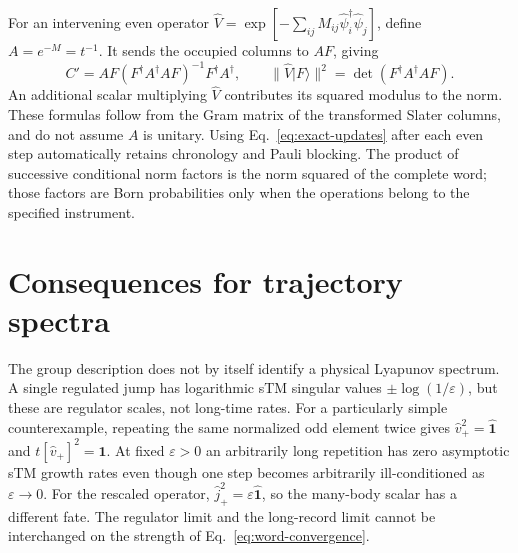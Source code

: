 \documentclass[aps,prb,onecolumn,nofootinbib,superscriptaddress]{revtex4-2}
\newcommand{\One}{\hat{\mathbf{1}}}
\newcommand{\Id}{\mathbf{1}}
\newcommand{\ket}[1]{\lvert #1\rangle}
\newcommand{\eps}{\varepsilon}
\begin{document}
For an intervening even operator
$\hat V=\exp[-\sum_{ij}M_{ij}\hat\psi_i^\dagger\hat\psi_j]$, define
$A=e^{-M}=t^{-1}$. It sends the occupied columns to $AF$, giving
\begin{equation}
 C'=AF(F^\dagger A^\dagger AF)^{-1}F^\dagger A^\dagger,
 \qquad
 \|\hat V\ket F\|^2=\det(F^\dagger A^\dagger AF).
 \label{eq:even-update}
\end{equation}
An additional scalar multiplying $\hat V$ contributes its squared modulus
to the norm. These formulas follow from the Gram matrix of the transformed
Slater columns, and do not assume $A$ is unitary. Using
Eq.~\eqref{eq:exact-updates} after each even step automatically retains
chronology and Pauli blocking. The product of successive conditional norm
factors is the norm squared of the complete word; those factors are Born
probabilities only when the operations belong to the specified instrument.

\section{Consequences for trajectory spectra}
The group description does not by itself identify a physical Lyapunov
spectrum. A single regulated jump has logarithmic sTM singular values
$\pm\log(1/\eps)$, but these are regulator scales, not long-time rates.
For a particularly simple counterexample, repeating the same normalized
odd element twice gives $\hat v_+^2=\One$ and $t[\hat v_+]^2=\Id$.
At fixed $\eps>0$ an arbitrarily long repetition has zero asymptotic sTM
growth rates even though one step becomes arbitrarily ill-conditioned
as $\eps\to0$. For the rescaled operator,
$\hat j_+^2=\eps\One$, so the many-body scalar has a different fate.
The regulator limit and the long-record limit cannot be interchanged
on the strength of Eq.~\eqref{eq:word-convergence}.
\end{document}
